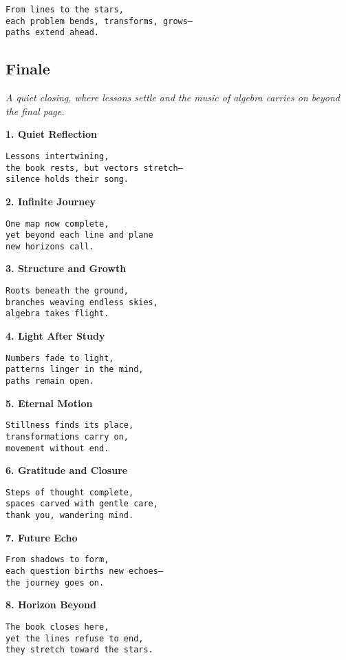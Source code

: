 \documentclass[
  letterpaper,
  DIV=11,
  numbers=noendperiod]{scrreprt}
\begin{document}
\begin{verbatim}
From lines to the stars,
each problem bends, transforms, grows—
paths extend ahead.
\end{verbatim}

\newpage

\subsection{Finale}\label{finale}

\emph{A quiet closing, where lessons settle and the music of algebra
carries on beyond the final page.}

\textbf{1. Quiet Reflection}

\begin{verbatim}
Lessons intertwining,
the book rests, but vectors stretch—
silence holds their song.
\end{verbatim}

\textbf{2. Infinite Journey}

\begin{verbatim}
One map now complete,
yet beyond each line and plane
new horizons call.
\end{verbatim}

\textbf{3. Structure and Growth}

\begin{verbatim}
Roots beneath the ground,
branches weaving endless skies,
algebra takes flight.
\end{verbatim}

\textbf{4. Light After Study}

\begin{verbatim}
Numbers fade to light,
patterns linger in the mind,
paths remain open.
\end{verbatim}

\textbf{5. Eternal Motion}

\begin{verbatim}
Stillness finds its place,
transformations carry on,
movement without end.
\end{verbatim}

\textbf{6. Gratitude and Closure}

\begin{verbatim}
Steps of thought complete,
spaces carved with gentle care,
thank you, wandering mind.
\end{verbatim}

\textbf{7. Future Echo}

\begin{verbatim}
From shadows to form,
each question births new echoes—
the journey goes on.
\end{verbatim}

\textbf{8. Horizon Beyond}

\begin{verbatim}
The book closes here,
yet the lines refuse to end,
they stretch toward the stars.
\end{verbatim}
\end{document}
